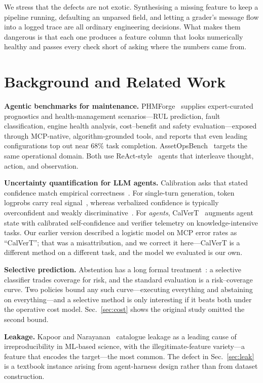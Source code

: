 \documentclass[conference]{IEEEtran}
\begin{document}
We stress that the defects are not exotic. Synthesising a missing feature to
keep a pipeline running, defaulting an unparsed field, and letting a grader's
message flow into a logged trace are all ordinary engineering decisions. What
makes them dangerous is that each one produces a feature column that looks
numerically healthy and passes every check short of asking where the numbers
came from.

\section{Background and Related Work}

\textbf{Agentic benchmarks for maintenance.} PHMForge~\cite{phmforge} supplies
expert-curated prognostics and health-management scenarios---RUL prediction,
fault classification, engine health analysis, cost--benefit and safety
evaluation---exposed through MCP-native, algorithm-grounded tools, and reports
that even leading configurations top out near $68\%$ task completion.
AssetOpsBench~\cite{assetops} targets the same operational domain. Both use
ReAct-style~\cite{react} agents that interleave thought, action, and
observation.

\textbf{Uncertainty quantification for LLM agents.} Calibration asks that stated
confidence match empirical correctness~\cite{guo,naeini}. For single-turn
generation, token logprobs carry real signal~\cite{kadavath}, whereas verbalized
confidence is typically overconfident and weakly discriminative~\cite{xiong}.
For \emph{agents}, CalVerT~\cite{calvert} augments agent state with calibrated
self-confidence and verifier telemetry on knowledge-intensive tasks. Our earlier
version described a logistic model on MCP error rates as ``CalVerT''; that was a
misattribution, and we correct it here---CalVerT is a different method on a
different task, and the model we evaluated is our own.

\textbf{Selective prediction.} Abstention has a long formal
treatment~\cite{elyaniv,geifman}: a selective classifier trades coverage for
risk, and the standard evaluation is a risk--coverage curve. Two policies bound
any such curve---executing everything and abstaining on everything---and a
selective method is only interesting if it beats both under the operative cost
model. Sec.~\ref{sec:cost} shows the original study omitted the second bound.

\textbf{Leakage.} Kapoor and Narayanan~\cite{kapoor} catalogue leakage as a
leading cause of irreproducibility in ML-based science, with the
illegitimate-feature variety---a feature that encodes the target---the most
common. The defect in Sec.~\ref{sec:leak} is a textbook instance arising from
agent-harness design rather than from dataset construction.
\end{document}
